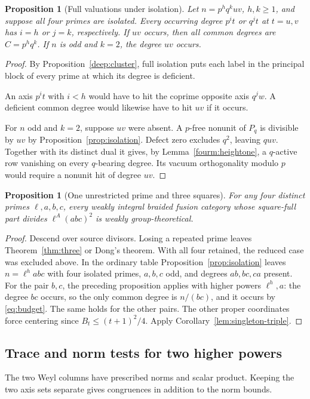 \documentclass[11pt,a4paper]{article}
\numberwithin{equation}{section}
\newtheorem{proposition}[theorem]{Proposition}
\theoremstyle{remark}
\begin{document}
\begin{proposition}[Full valuations under isolation]\label{fam:M:8.11}\label{seq:sextic-fully-separated}
Let $n=p^h q^k uv$, $h,k\ge1$, and suppose all four primes are isolated. Every
occurring degree $p^it$ or $q^jt$ at $t=u,v$ has $i=h$ or $j=k$,
respectively. If $uv$ occurs, then all common degrees are $C=p^h q^k$.
If $n$ is odd and $k=2$, the degree $uv$ occurs.
\end{proposition}
\begin{proof}
By Proposition~\ref{deep:cluster}, full isolation puts each label in
the principal block of every prime at which its degree is deficient.

An axis $p^it$ with
$i<h$ would have to hit the coprime opposite axis $q^jw$.
A deficient common degree would likewise have to hit $uv$ if it occurs.

For $n$ odd and $k=2$, suppose $uv$ were absent. A $p$-free nonunit
of $P_q$ is divisible by $uv$ by Proposition~\ref{prop:isolation}.
Defect zero excludes $q^2$, leaving $quv$. Together with its distinct
dual it gives, by Lemma~\ref{fourm:heightone}, a $q$-active row
vanishing on every $q$-bearing degree. Its vacuum orthogonality
modulo $p$ would require a nonunit hit of degree $uv$.
\end{proof}

\begin{proposition}[One unrestricted prime and three squares]\label{fam:M:8.12}\label{seq:one-unrestricted}\label{thm:four}
For any four distinct primes $\ell,a,b,c$, every weakly integral braided
fusion category whose square-full part divides $\ell^{A}(abc)^2$ is
weakly group-theoretical.
\end{proposition}
\begin{proof}
Descend over source divisors. Losing a repeated prime leaves
Theorem~\ref{thm:three} or Dong's theorem. With all four retained,
the reduced case was excluded above. In the ordinary table
Proposition~\ref{prop:isolation} leaves $n=\ell^h abc$ with four
isolated primes, $a,b,c$ odd, and degrees $ab,bc,ca$ present.
For the pair $b,c$, the preceding proposition applies with higher
powers $\ell^h,a$: the degree $bc$ occurs, so the only common degree
is $n/(bc)$, and it occurs by \eqref{eq:budget}. The same holds
for the other pairs.
The other proper coordinates force centering since $B_t\le(t+1)^2/4$.
Apply Corollary~\ref{lem:singleton-triple}.
\end{proof}

\subsection{Trace and norm tests for two higher powers}\label{fam:M:sec:8.2}
The two Weyl columns have prescribed norms and scalar product.
Keeping the two axis sets separate gives congruences in addition
to the norm bounds.
\end{document}
